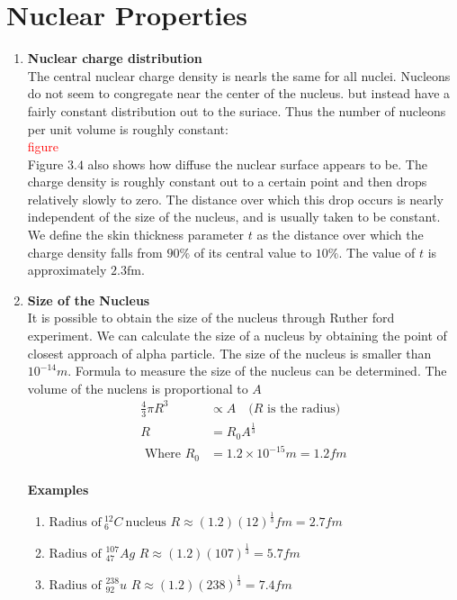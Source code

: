 \section{Nuclear Properties}
\begin{enumerate}
	\item \textbf{Nuclear charge distribution}\\
 The central nuclear charge density is nearls the same for all nuclei. Nucleons do not seem to congregate near the center of the nucleus. but instead have a fairly constant distribution out to the suriace. Thus the number of nucleons per unit volume is roughly constant:\\
 \textcolor{red}{figure}\\
 Figure $3.4$ also shows how diffuse the nuclear surface appears to be. The charge density is roughly constant out to a certain point and then drops relatively slowly to zero. The distance over which this drop occurs is nearly independent of the size of the nucleus, and is usually taken to be constant. We define the skin thickness parameter $t$ as the distance over which the charge density falls from $90 \%$ of its central value to $10 \%$. The value of $t$ is approximately $2.3 \mathrm{fm}$.
	\item \textbf{Size of the Nucleus}\\
It is possible to obtain the size of the nucleus through Ruther ford experiment. We can calculate the size of a nucleus by obtaining the point of closest approach of alpha particle. The size of the nucleus is smaller than $10^{-14}m$. Formula to measure the size of the nucleus can be determined. The volume of the nuclens is proportional to  $A$ \\
\begin{align*}
\frac{4}{3}\pi R^3&\propto A\quad\text{($R$ is the radius) }\\
R&=R_0 A^\frac{1}{3}\\
\text{ Where }R_0&= 1.2\times 10^{-15}m=1.2 fm
\end{align*}
\\
\textbf{Examples}
\begin{enumerate}
	\item $ \text{Radius of}\ ^{12}_6 C\  \text{nucleus}$
$R\approx(1.2)(12)^\frac{1}{3}fm=2.7fm$
\item $ \text{Radius of }^{107}_{47}Ag$
$R\approx(1.2)(107)^\frac{1}{3}=5.7fm$
 \item $ \text{Radius of }^{238}_{92}u$
$R\approx(1.2)(238)^\frac{1}{3}=7.4fm$

\end{enumerate}
\end{enumerate}
